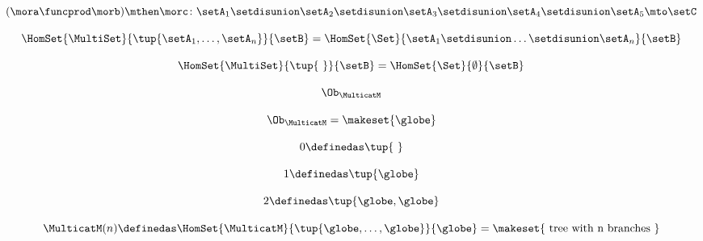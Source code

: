 {\begin{forslides}
        \begin{equation}
            \label{eq:slides_multicategories_24}
            (\mora \funcprod \morb) \mthen \morc \colon \setA_1 \setdisunion \setA_2 \setdisunion \setA_3 \setdisunion \setA_4 \setdisunion \setA_5 \mto \setC
        \end{equation}

        \begin{equation}
            \label{eq:slides_multicategories_25}
            \HomSet{\MultiSet}{\tup{\setA_1,\ldots,\setA_n}}{\setB}=\HomSet{\Set}{\setA_1 \setdisunion \ldots \setdisunion \setA_n}{\setB}
        \end{equation}

        \begin{equation}
            \label{eq:slides_multicategories_26}
            \HomSet{\MultiSet}{\tup{ \ }}{\setB}=\HomSet{\Set}{ \emptyset }{\setB}
        \end{equation}

        \begin{equation}
            \label{eq:slides_multicategories_27}
            \Ob_{\MulticatM}
        \end{equation}

        \begin{equation}
            \label{eq:slides_multicategories_28}
            \Ob_{\MulticatM} = \makeset{\globe}
        \end{equation}

        \begin{equation}
            \label{eq:slides_multicategories_29}
            0 \definedas \tup{ \ }
        \end{equation}

        \begin{equation}
            \label{eq:slides_multicategories_30}
            1 \definedas \tup{ \globe }
        \end{equation}

        \begin{equation}
            \label{eq:slides_multicategories_31}
            2 \definedas \tup{ \globe, \globe }
        \end{equation}

        \begin{equation}
            \label{eq:slides_multicategories_32}
            \MulticatM(n) \definedas \HomSet{\MulticatM}{\tup{\globe,\ldots ,\globe}}{\globe} = \makeset{\text{ tree with n branches }}
        \end{equation}


\end{forslides}}

